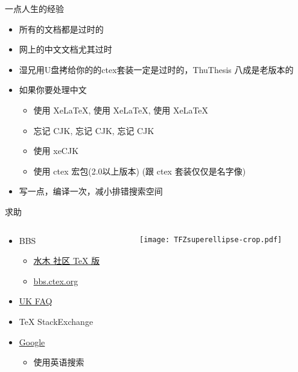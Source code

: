 \begin{frame}{一点人生的经验}
  \begin{itemize}
    \item 所有的文档都是过时的
    \item 网上的中文文档尤其过时
    \item 湿兄用U盘拷给你的的ctex套装一定是过时的，ThuThesis 八成是老版本的
    \item 如果你要处理中文
      \begin{itemize}
        \item 使用 XeLaTeX, 使用 XeLaTeX, 使用 XeLaTeX
        \item 忘记 CJK, 忘记 CJK, 忘记 CJK
        \item 使用 xeCJK
        \item 使用 ctex 宏包(2.0以上版本) (跟 ctex 套装仅仅是名字像)
      \end{itemize}
    \item 写一点，编译一次，减小排错搜索空间
  \end{itemize} 
\end{frame}

\begin{frame}{求助}
	\begin{columns}[c]
		\begin{column}{.45\textwidth}
			\begin{itemize}
				\item BBS
					\begin{itemize}
						\item \href{http://www.newsmth.net/nForum/board/TeX}{水木
							社区 TeX 版}
						\item \href{http://bbs.ctex.org/}{bbs.ctex.org}
					\end{itemize}
				\item \href{http://www.tex.ac.uk/cgi-bin/texfaq2html}{UK FAQ}
				\item TeX StackExchange
				\item \href{http://justfuckinggoogleit.com/}{Google}
          \begin{itemize}
            \item 使用英语搜索
          \end{itemize}
			\end{itemize}
		\end{column}
		\begin{column}{.45\textwidth}
			\texttt{[image: TFZsuperellipse-crop.pdf]}
		\end{column}
	\end{columns}
\end{frame}

